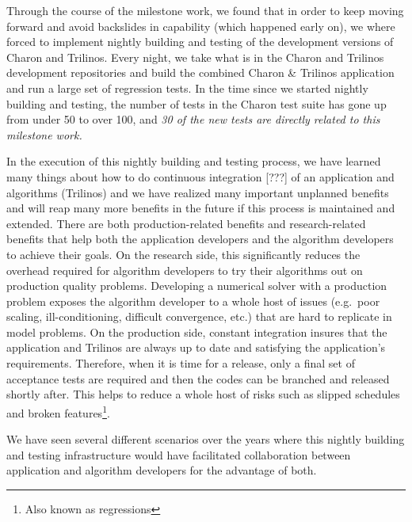 \documentclass[pdf,ps2pdf,11pt]{SANDreport}
\begin{document}
Through the course of the milestone work, we found that in order to keep
moving forward and avoid backslides in capability (which happened early on),
we where forced to implement nightly building and testing of the development
versions of Charon and Trilinos.  Every night, we take what is in the Charon
and Trilinos development repositories and build the combined Charon \&
Trilinos application and run a large set of regression tests.  In the time
since we started nightly building and testing, the number of tests in the
Charon test suite has gone up from under 50 to over 100, and {\em 30 of the
new tests are directly related to this milestone work.}

In the execution of this nightly building and testing process, we have learned
many things about how to do continuous integration [???] of an application and
algorithms (Trilinos) and we have realized many important unplanned benefits
and will reap many more benefits in the future if this process is maintained
and extended.  There are both production-related benefits and research-related
benefits that help both the application developers and the algorithm
developers to achieve their goals.  On the research side, this significantly
reduces the overhead required for algorithm developers to try their algorithms
out on production quality problems.  Developing a numerical solver with a
production problem exposes the algorithm developer to a whole host of issues
(e.g.\ poor scaling, ill-conditioning, difficult convergence, etc.) that are
hard to replicate in model problems.  On the production side, constant
integration insures that the application and Trilinos are always up to date
and satisfying the application's requirements.  Therefore, when it is time for
a release, only a final set of acceptance tests are required and then the
codes can be branched and released shortly after.  This helps to reduce a
whole host of risks such as slipped schedules and broken
features\footnote{Also known as regressions}.



We have seen several different scenarios over the years where this nightly
building and testing infrastructure would have facilitated collaboration
between application and algorithm developers for the advantage of both.
\end{document}
